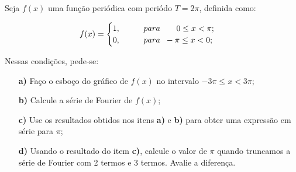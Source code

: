 \linespread{1.5}
Seja $f(x)$ uma função periódica com periódo $T = 2\pi$, definida como:

\begin{equation*}
    f(x) = \begin{cases}
     1, \hspace{1cm} para\hspace{0.7cm} 0 \leq x < \pi;\\
     0, \hspace{1cm} para\hspace{0.2cm} -\pi \leq x < 0;
    \end{cases}\,
\end{equation*}

Nessas condições, pede-se:
\begin{itemize}
    \item[\textbf{a)}] Faço o esboço do gráfico de $f(x)$ no intervalo $-3\pi \leq x < 3\pi$;
    \item[\textbf{b)}] Calcule a série de Fourier de $f(x)$;
    \item[\textbf{c)}] Use os resultados obtidos nos itens \textbf{a)} e \textbf{b)} para obter uma expressão em série para $\pi$;
    \item[\textbf{d)}] Usando o resultado do item \textbf{c)}, calcule o valor de $\pi$ quando truncamos a série de Fourier com 2 termos e 3 termos. Avalie a diferença.
\end{itemize}